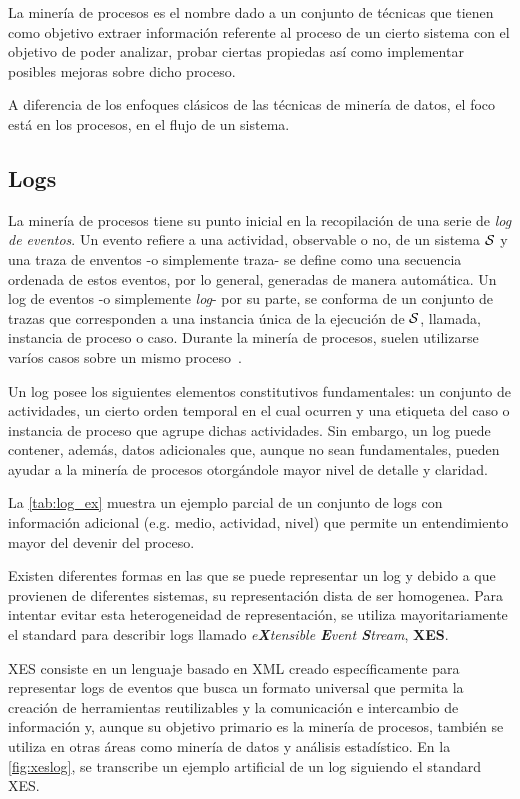 La minería de procesos es el nombre dado a un conjunto de técnicas que tienen
como objetivo extraer información referente al proceso de un cierto sistema
con el objetivo de poder analizar, probar ciertas propiedas 
así como implementar posibles mejoras sobre dicho proceso.

A diferencia de los enfoques clásicos de las técnicas de minería de datos, el foco
está en los procesos, en el flujo de un sistema.

\subsection{Logs} 
\label{sec:2.logs}

La minería de procesos tiene su punto inicial en la recopilación de una serie de \textit{log de eventos}. 
Un evento refiere a una actividad, observable o no, de un sistema $\mathcal{S}$ y
una traza de enventos -o simplemente traza- se define como una secuencia
ordenada de estos eventos, por lo general, generadas de manera automática.
Un log de eventos -o simplemente \textit{log}- por su parte, se conforma de un
conjunto de trazas que corresponden a una instancia única de la ejecución de $\mathcal{S}$,
llamada, instancia de proceso o caso. Durante la minería de procesos,
suelen utilizarse varíos casos sobre un mismo proceso~\cite{Aalst2004}.

Un log posee los siguientes elementos constitutivos fundamentales: un conjunto de actividades,
un cierto orden temporal en el cual ocurren y una etiqueta del  caso o instancia de proceso
que agrupe dichas actividades.
Sin embargo, un log puede contener, además, datos adicionales que, aunque no sean fundamentales, pueden
ayudar a la minería de procesos otorgándole mayor nivel de detalle y claridad.

La \autoref{tab:log_ex} muestra un ejemplo parcial de un conjunto de logs con información 
adicional (e.g. medio, actividad, nivel) que permite un entendimiento mayor del devenir del proceso.



Existen diferentes formas en las que se puede representar un log y debido a que provienen de diferentes
sistemas, su representación dista de ser homogenea. Para intentar evitar esta heterogeneidad de representación,
se utiliza mayoritariamente el standard para describir logs llamado 
\textit{e\textbf{X}tensible \textbf{E}vent \textbf{S}tream}, \textbf{XES}.

XES consiste en un lenguaje basado en XML creado específicamente para representar logs de eventos que busca 
un formato universal que permita la creación de herramientas reutilizables y la comunicación e intercambio de 
información y, aunque su objetivo primario es la minería de procesos, también se 
utiliza en otras áreas como minería de datos y análisis estadístico.
En la \autoref{fig:xeslog}, se transcribe un ejemplo artificial de un log siguiendo el standard XES.

